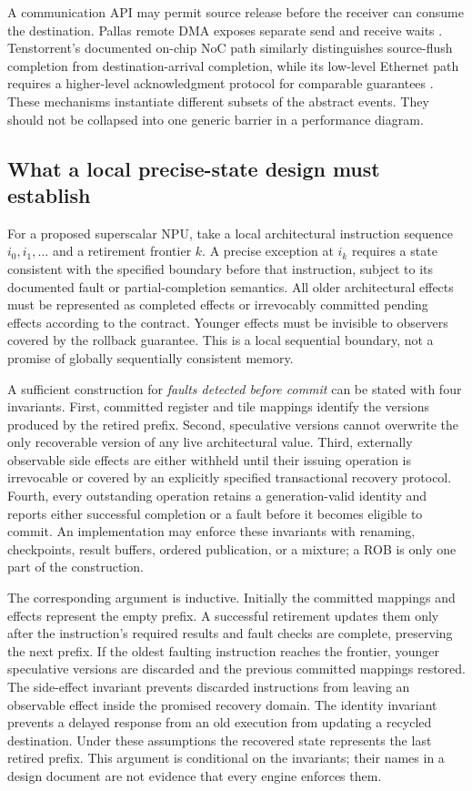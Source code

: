 A communication API may permit source release before the receiver can consume the destination. Pallas remote DMA exposes separate send and receive waits \citep{u007_pallas_distributed}. Tenstorrent's documented on-chip NoC path similarly distinguishes source-flush completion from destination-arrival completion, while its low-level Ethernet path requires a higher-level acknowledgment protocol for comparable guarantees \citep{u007_tt_ethernet}. These mechanisms instantiate different subsets of the abstract events. They should not be collapsed into one generic barrier in a performance diagram.

\subsection{What a local precise-state design must establish}

For a proposed superscalar NPU, take a local architectural instruction sequence $i_0,i_1,\ldots$ and a retirement frontier $k$. A precise exception at $i_k$ requires a state consistent with the specified boundary before that instruction, subject to its documented fault or partial-completion semantics. All older architectural effects must be represented as completed effects or irrevocably committed pending effects according to the contract. Younger effects must be invisible to observers covered by the rollback guarantee. This is a local sequential boundary, not a promise of globally sequentially consistent memory.

A sufficient construction for \emph{faults detected before commit} can be stated with four invariants. First, committed register and tile mappings identify the versions produced by the retired prefix. Second, speculative versions cannot overwrite the only recoverable version of any live architectural value. Third, externally observable side effects are either withheld until their issuing operation is irrevocable or covered by an explicitly specified transactional recovery protocol. Fourth, every outstanding operation retains a generation-valid identity and reports either successful completion or a fault before it becomes eligible to commit. An implementation may enforce these invariants with renaming, checkpoints, result buffers, ordered publication, or a mixture; a ROB is only one part of the construction.

The corresponding argument is inductive. Initially the committed mappings and effects represent the empty prefix. A successful retirement updates them only after the instruction's required results and fault checks are complete, preserving the next prefix. If the oldest faulting instruction reaches the frontier, younger speculative versions are discarded and the previous committed mappings restored. The side-effect invariant prevents discarded instructions from leaving an observable effect inside the promised recovery domain. The identity invariant prevents a delayed response from an old execution from updating a recycled destination. Under these assumptions the recovered state represents the last retired prefix. This argument is conditional on the invariants; their names in a design document are not evidence that every engine enforces them.

